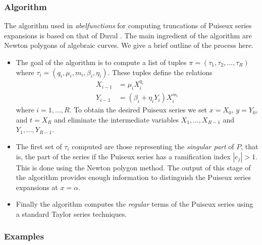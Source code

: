 \subsubsection*{Algorithm}

The algorithm used in {\it abelfunctions} for computing truncations of
Puiseux series expansions is based on that of Duval \cite{Duval89}. The
main ingredient of the algorithm are Newton polygons of algebraic
curves. We give a brief outline of the process here.
\begin{itemize}
  \item The goal of the algorithm is to compute a list of tuples $\pi =
    (\tau_1, \tau_2, \ldots, \tau_R)$ where $\tau_i =
    (q_i,\mu_i,m_i,\beta_i,\eta_i)$. These tuples define the relations
    \begin{align*}
      X_{i-1} &= \mu_i X_i^{q_i} \\
      Y_{i-1} &= (\beta_i + \eta_iY_i)X_i^{m_i}
    \end{align*}
    where $i = 1, \ldots, R$. To obtain the desired Puiseux series we
    set $x = X_0$, $y = Y_0$, and $t = X_R$ and eliminate the
    intermediate variables $X_1,\ldots,X_{R-1}$ and
    $Y_1,\ldots,Y_{R-1}$.
  \item The first set of $\tau_i$ computed are those representing the
    {\it singular part} of $P$, that is, the part of the series if the
    Puiseux series has a ramification index $|e_j|>1$. This is done
    using the Newton polygon method. The output of this stage of the
    algorithm provides enough information to distinguish the Puiseux
    series expansions at $x=\alpha$.
  \item Finally the algorithm computes the {\it regular} terms of the
    Puiseux series using a standard Taylor series techniques.
\end{itemize}

\subsubsection*{Examples}

